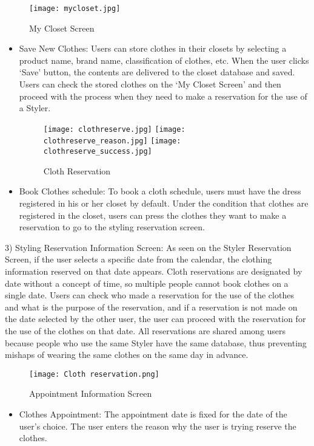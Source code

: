 \documentclass[conference]{IEEEtran}
\begin{document}
\newpage
\begin{figure}[htbp]
\centerline{\texttt{[image: mycloset.jpg]}}
\label{fig}
\caption{My Closet Screen}
\end{figure}

\begin{itemize}
    \item Save New Clothes: Users can store clothes in their closets by selecting a product name, brand name, classification of clothes, etc. When the user clicks ‘Save’ button, the contents are delivered to the closet database and saved. Users can check the stored clothes on the ‘My Closet Screen’ and then proceed with the process when they need to make a reservation for the use of a Styler.\\
    
    \begin{figure}[htbp]
    \centerline{
    \texttt{[image: clothreserve.jpg]}
    \texttt{[image: clothreserve\_reason.jpg]}
    \texttt{[image: clothreserve\_success.jpg]}
    }
    \label{fig}
    \caption{Cloth Reservation}
    \end{figure}
    \item Book Clothes schedule: To book a cloth schedule, users must have the dress registered in his or her closet by default. Under the condition that clothes are registered in the closet, users can press the clothes they want to make a reservation to go to the styling reservation screen.\\
\end{itemize}

3) Styling Reservation Information Screen: As seen on the Styler Reservation Screen, if the user selects a specific date from the calendar, the clothing information reserved on that date appears.
Cloth reservations are designated by date without a concept of time, so multiple people cannot book clothes on a single date. Users can check who made a reservation for the use of the clothes and what is the purpose of the reservation, and if a reservation is not made on the date selected by the other user, the user can proceed with the reservation for the use of the clothes on that date. 
All reservations are shared among users because people who use the same Styler have the same database, thus preventing mishaps of wearing the same clothes on the same day in advance.\\

\begin{figure}[htbp]
\centerline{\texttt{[image: Cloth reservation.png]}}
\label{fig}
\caption{Appointment Information Screen}
\end{figure}
\begin{itemize}
    \item Clothes Appointment: The appointment date is fixed for the date of the user’s choice. The user enters the reason why the user is trying reserve the clothes.\\
\end{itemize}
    
\end{document}
